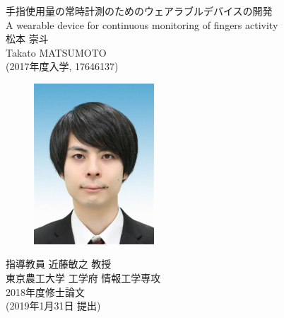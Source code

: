 \thispagestyle{empty}
\begin{center}
	{\Huge 手指使用量の常時計測のためのウェアラブルデバイスの開発}\\
	\vspace{2mm}
	{\Large A wearable device for continuous monitoring of fingers activity}\\
	\vspace{7mm}
	{\Huge 松本 崇斗}\\
	\vspace{2mm}
	{\Large Takato MATSUMOTO}\\
	\vspace{10mm}
	{\Large (2017年度入学, 17646137)}\\
	\vspace{25mm}

	\begin{figure}[H]
		\begin{center}
			\vspace{7mm}
			\includegraphics[width=45mm]{fig/face_photo.jpg}
		\end{center}
	\end{figure}

	\vspace{25mm}
	{\Huge 指導教員 近藤敏之 教授}\\
	\vspace{12mm}
	{\Large 東京農工大学 工学府 情報工学専攻}\\
	\vspace{2mm}
	{\Large 2018年度修士論文}\\
	\vspace{2mm}
	{\Large (2019年1月31日 提出)}\\
\end{center}